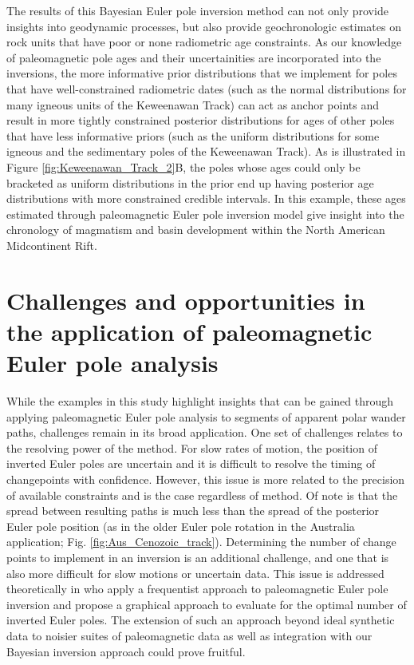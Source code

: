 \documentclass[]{agujournal2019}
\begin{document}
The results of this Bayesian Euler pole inversion method can not only provide insights into geodynamic processes, but also provide geochronologic estimates on rock units that have poor or none radiometric age constraints. As our knowledge of paleomagnetic pole ages and their uncertainities are incorporated into the inversions, the more informative prior distributions that we implement for poles that have well-constrained radiometric dates (such as the normal distributions for many igneous units of the Keweenawan Track) can act as anchor points and result in more tightly constrained posterior distributions for ages of other poles that have less informative priors (such as the uniform distributions for some igneous and the sedimentary poles of the Keweenawan Track). As is illustrated in Figure \ref{fig:Keweenawan_Track_2}B, the poles whose ages could only be bracketed as uniform distributions in the prior end up having posterior age distributions with more constrained credible intervals. In this example, these ages estimated through paleomagnetic Euler pole inversion model give insight into the chronology of magmatism and basin development within the North American Midcontinent Rift. 

\section{Challenges and opportunities in the application of paleomagnetic Euler pole analysis}
\label{sec:challenges_and_opportunities}

While the examples in this study highlight insights that can be gained through applying paleomagnetic Euler pole analysis to segments of apparent polar wander paths, challenges remain in its broad application. One set of challenges relates to the resolving power of the method. For slow rates of motion, the position of inverted Euler poles are uncertain and it is difficult to resolve the timing of changepoints with confidence. However, this issue is more related to the precision of available constraints and is the case regardless of method. Of note is that the spread between resulting paths is much less than the spread of the posterior Euler pole position (as in the older Euler pole rotation in the Australia application; Fig. \ref{fig:Aus_Cenozoic_track}). Determining the number of change points to implement in an inversion is an additional challenge, and one that is also more difficult for slow motions or uncertain data. This issue is addressed theoretically in  who apply a frequentist approach to paleomagnetic Euler pole inversion and propose a graphical approach to evaluate for the optimal number of inverted Euler poles. The extension of such an approach beyond ideal synthetic data to noisier suites of paleomagnetic data as well as integration with our Bayesian inversion approach could prove fruitful. 
\end{document}
